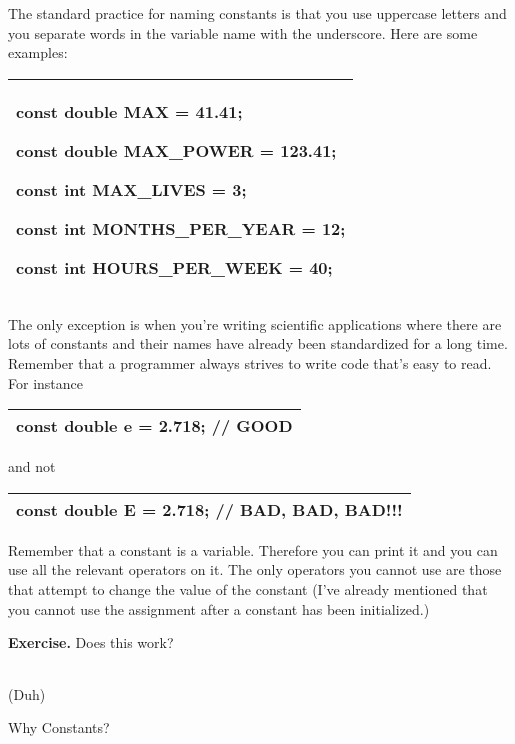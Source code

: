\documentclass[
]{article}
\begin{document}
\begin{longtable}[]{@{}@{}}
\toprule
\endhead
\bottomrule
\end{longtable}

The standard practice for naming constants is that you use uppercase
letters and you separate words in the variable name with the underscore.
Here are some examples:

\begin{longtable}[]{@{}l@{}}
\toprule
\endhead
\begin{minipage}[t]{0.97\columnwidth}\raggedright
const double MAX = 41.41;

const double MAX\_POWER = 123.41;

const int MAX\_LIVES = 3;

const int MONTHS\_PER\_YEAR = 12;

const int HOURS\_PER\_WEEK = 40;\strut
\end{minipage}\tabularnewline
\bottomrule
\end{longtable}

The only exception is when you're writing scientific applications where
there are lots of constants and their names have already been
standardized for a long time. Remember that a programmer always strives
to write code that's easy to read. For instance

\begin{longtable}[]{@{}l@{}}
\toprule
\endhead
const double e = 2.718; // GOOD\tabularnewline
\bottomrule
\end{longtable}

and not

\begin{longtable}[]{@{}l@{}}
\toprule
\endhead
const double E = 2.718; // BAD, BAD, BAD!!!\tabularnewline
\bottomrule
\end{longtable}

Remember that a constant is a variable. Therefore you can print it and
you can use all the relevant operators on it. The only operators you
cannot use are those that attempt to change the value of the constant
(I've already mentioned that you cannot use the assignment after a
constant has been initialized.)

\textbf{Exercise.} Does this work?

\begin{longtable}[]{@{}@{}}
\toprule
\endhead
\bottomrule
\end{longtable}

(Duh)

Why Constants?
\end{document}
